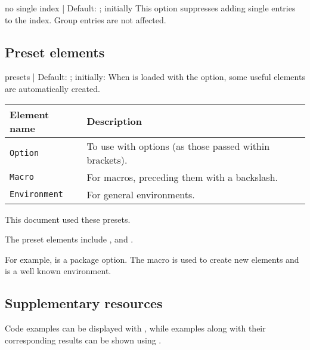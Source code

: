 \documentclass[11pt]{article}
\begin{document}
\begin{Optiondef}{no single index}{ | }{Default: ; initially }
    This option suppresses adding single entries to the index. Group entries are not affected.
\end{Optiondef}

\subsection{Preset elements}\label{sec:preset-elements}


\begin{Optiondef}{presets}{ | }{Default: ; initially: }
    When  is loaded with the  option, some useful elements are automatically created.

    \bigskip
    \begin{tabular}{ll}
        \textbf{Element name} & \textbf{Description}                                   \\
        \hline
        \texttt{Option}       & To use with options (as those passed within brackets). \\
        \texttt{Macro}        & For macros, preceding them with a backslash.           \\
        \texttt{Environment}  & For general environments.                              \\
    \end{tabular}

    \bigskip
    This document used these presets.
\end{Optiondef}


\begin{PDExample}
    The preset elements include ,  and .

    For example,  is a package option. The  macro is used to create new elements and  is a well known environment.
\end{PDExample}

\subsection{Supplementary resources}

Code examples can be displayed with , while examples along with their corresponding results can be shown using .
\end{document}
